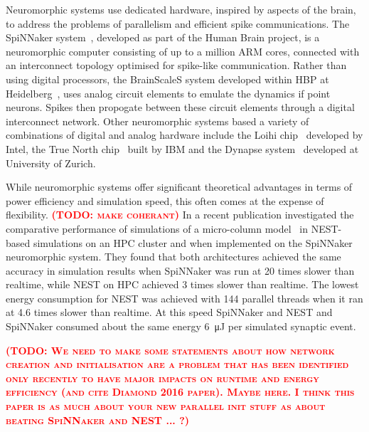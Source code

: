 \documentclass[utf8]{frontiersSCNS} %
\newcommand{\todo}[1]{\textbf{\textsc{\textcolor{red}{(TODO: #1)}}}}
\begin{document}
Neuromorphic systems use dedicated hardware, inspired by aspects of the brain, to address the problems of parallelism and efficient spike communications.
The SpiNNaker system~\citep{Furber2014}, developed as part of the Human Brain project, is a neuromorphic computer consisting of up to a million ARM cores, connected with an interconnect topology optimised for spike-like communication.
Rather than using digital processors, the BrainScaleS system developed within HBP at Heidelberg~\citep{Schemmel2017}, uses analog circuit elements to emulate the dynamics if point neurons.
Spikes then propogate between these circuit elements through a digital interconnect network.
Other neuromorphic systems based a variety of combinations of digital and analog hardware include the Loihi chip~\citep{Davies2018} developed by Intel, the True North chip~\citep{Merolla2014} built by IBM and the Dynapse system~\cite{Qiao2015} developed at University of Zurich.

While neuromorphic systems offer significant theoretical advantages in terms of power efficiency and simulation speed, this often comes at the expense of flexibility.
\todo{make coherant}
In a recent publication \citet{VanAlbada2018} investigated the comparative performance of simulations of a micro-column model~\citep{Potjans2012} in NEST-based simulations on an HPC cluster and when implemented on the SpiNNaker neuromorphic system.
They found that both architectures achieved the same accuracy in simulation results when SpiNNaker was run at 20 times slower than realtime, while NEST on HPC achieved 3 times slower than realtime. 
The lowest energy consumption for NEST was achieved with 144 parallel threads when it ran at 4.6 times slower than realtime. 
At this speed SpiNNaker and NEST and SpiNNaker consumed about the same energy \SI{6}{\micro\joule} per simulated synaptic event.

\todo{We need to make some statements about how network creation and
  initialisation are a problem that has been identified only recently
  to have major impacts on runtime and energy efficiency (and cite
  Diamond 2016 paper). Maybe here. I think this paper is as much about your new
  parallel init stuff as about beating SpiNNaker and NEST ... ?}
\end{document}
